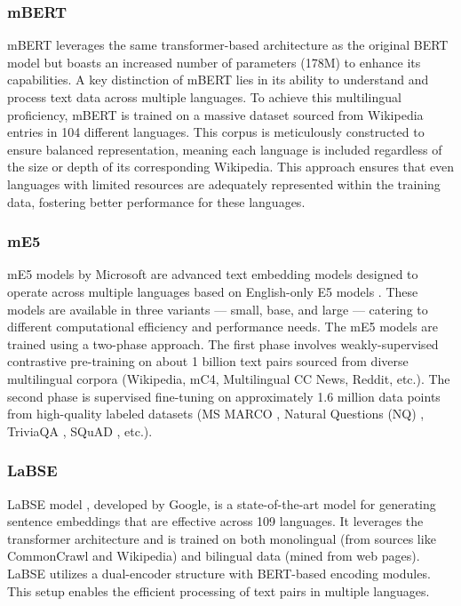 \subsubsection{\ac{mBERT}} \label{model:mbert}
\ac{mBERT} \cite{devlin2019bert} leverages the same transformer-based architecture as the original \ac{BERT} model but boasts an increased number of parameters (178M) to enhance its capabilities.
A key distinction of \ac{mBERT} lies in its ability to understand and process text data across multiple languages.
To achieve this multilingual proficiency, \ac{mBERT} is trained on a massive dataset sourced from Wikipedia entries in 104 different languages.
This corpus is meticulously constructed to ensure balanced representation, meaning each language is included regardless of the size or depth of its corresponding Wikipedia.
This approach ensures that even languages with limited resources are adequately represented within the training data, fostering better performance for these languages.

\subsubsection{\ac{mE5}} \label{model:me5}
\ac{mE5} models by Microsoft \cite{wang2024multilingual} are advanced text embedding models designed to operate across multiple languages based on English-only E5 models \cite{wang2024text}.
These models are available in three variants — small, base, and large — catering to different computational efficiency and performance needs.
The \ac{mE5} models are trained using a two-phase approach.
The first phase involves weakly-supervised contrastive pre-training on about 1 billion text pairs sourced from diverse multilingual corpora (Wikipedia, mC4, Multilingual CC News, Reddit, etc.).
The second phase is supervised fine-tuning on approximately 1.6 million data points from high-quality labeled datasets (MS MARCO \cite{bajaj2018ms}, Natural Questions (NQ) \cite{kwiatkowski2019natural}, TriviaQA \cite{joshi2017triviaqa}, SQuAD \cite{rajpurkar2016squad}, etc.).

\subsubsection{\ac{LaBSE}} \label{model:labse}
\ac{LaBSE} model \cite{feng2022languageagnostic}, developed by Google, is a state-of-the-art model for generating sentence embeddings that are effective across 109 languages.
It leverages the transformer architecture and is trained on both monolingual (from sources like CommonCrawl \cite{commoncrawl} and Wikipedia) and bilingual data (mined from web pages).
\ac{LaBSE} utilizes a dual-encoder structure with \ac{BERT}-based encoding modules.
This setup enables the efficient processing of text pairs in multiple languages.

